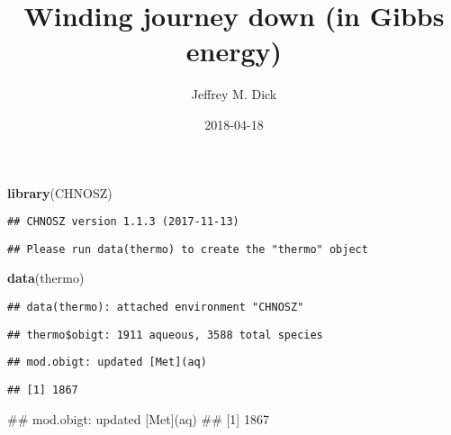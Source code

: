 \documentclass[]{article}
\title{Winding journey down (in Gibbs energy)}
\author{Jeffrey M. Dick}
\date{2018-04-18}
\newenvironment{Shaded}{\begin{snugshade}}{\end{snugshade}}
\newcommand{\KeywordTok}[1]{\textcolor[rgb]{0.13,0.29,0.53}{\textbf{#1}}}
\newcommand{\DataTypeTok}[1]{\textcolor[rgb]{0.13,0.29,0.53}{#1}}
\newcommand{\DecValTok}[1]{\textcolor[rgb]{0.00,0.00,0.81}{#1}}
\newcommand{\StringTok}[1]{\textcolor[rgb]{0.31,0.60,0.02}{#1}}
\newcommand{\OperatorTok}[1]{\textcolor[rgb]{0.81,0.36,0.00}{\textbf{#1}}}
\newcommand{\NormalTok}[1]{#1}
\begin{document}
\maketitle

{
\setcounter{tocdepth}{2}
\tableofcontents
}
\begin{Shaded}
\begin{Highlighting}[]
\KeywordTok{library}\NormalTok{(CHNOSZ)}
\end{Highlighting}
\end{Shaded}

\begin{verbatim}
## CHNOSZ version 1.1.3 (2017-11-13)
\end{verbatim}

\begin{verbatim}
## Please run data(thermo) to create the "thermo" object
\end{verbatim}

\begin{Shaded}
\begin{Highlighting}[]
\KeywordTok{data}\NormalTok{(thermo)}
\end{Highlighting}
\end{Shaded}

\begin{verbatim}
## data(thermo): attached environment "CHNOSZ"
\end{verbatim}

\begin{verbatim}
## thermo$obigt: 1911 aqueous, 3588 total species
\end{verbatim}

\begin{Shaded}
\end{Shaded}

\begin{verbatim}
## mod.obigt: updated [Met](aq)
\end{verbatim}

\begin{verbatim}
## [1] 1867
\end{verbatim}

\begin{Shaded}
\begin{Highlighting}[]
\NormalTok{## mod.obigt: updated [Met](aq)}
\NormalTok{## [1] 1867}
\end{Highlighting}
\end{Shaded}
\end{document}
